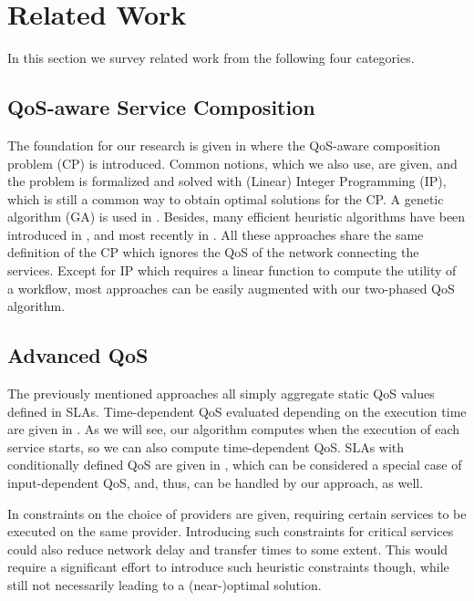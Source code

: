 \documentclass[10pt, conference, compsocconf]{IEEEtran}
\begin{document}
\section{Related Work}
\label{related}
\noindent In this section we survey related work from the following four categories.

\subsection{QoS-aware Service Composition}
\noindent The foundation for our research is given in \cite{Zeng2003} where the QoS-aware composition problem (CP) is introduced.
Common notions, which we also use, are given, and the problem is formalized and solved with (Linear) Integer Programming (IP),
	which is still a common way to obtain optimal solutions for the CP.
A genetic algorithm (GA) is used in \cite{Canfora2005,Jaeger2007}.
Besides, many efficient heuristic algorithms have been introduced in \cite{Alrifai2009,Lecue2009,Yu2007},
	and most recently in \cite{Alrifai2010,Klein2011,Rosenberg2010}.
All these approaches share the same definition of the CP which ignores the QoS of the network connecting the services.
Except for IP which requires a linear function to compute the utility of a workflow,
	most approaches can be easily augmented with our two-phased QoS algorithm.

\subsection{Advanced QoS}
\noindent The previously mentioned approaches all simply aggregate static QoS values defined in SLAs.
Time-dependent QoS evaluated depending on the execution time are given in \cite{Kloepper2010}.
As we will see, our algorithm computes when the execution of each service starts,
	so we can also compute time-dependent QoS.
SLAs with conditionally defined QoS are given in \cite{Klein2009},
	which can be considered a special case of input-dependent QoS,
		and, thus, can be handled by our approach, as well. 

In \cite{Menasce2009} constraints on the choice of providers are given,
	requiring certain services to be executed on the same provider.
Introducing such constraints for critical services could also reduce network delay and transfer times to some extent.
This would require a significant effort to introduce such heuristic constraints though,
	while still not necessarily leading to a (near-)optimal solution.	
\end{document}
